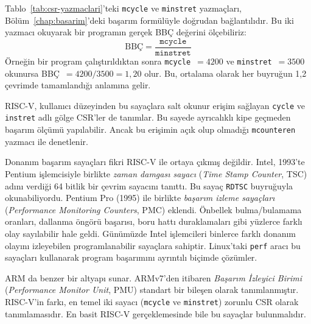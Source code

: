 \begin{bilginot}
Tablo~\ref{tab:csr-yazmaclari}'teki \texttt{mcycle} ve \texttt{minstret} yazmaçları, Bölüm~\ref{chap:basarim}'deki başarım formülüyle doğrudan bağlantılıdır. Bu iki yazmacı okuyarak bir programın gerçek BBÇ değerini ölçebiliriz:
\[
\text{BBÇ} = \frac{\texttt{mcycle}}{\texttt{minstret}}
\]
Örneğin bir program çalıştırıldıktan sonra \texttt{mcycle}~$= 4200$ ve \texttt{minstret}~$= 3500$ okunursa BBÇ~$= 4200 / 3500 = 1{,}20$ olur. Bu, ortalama olarak her buyruğun 1,2 çevrimde tamamlandığı anlamına gelir.

RISC-V, kullanıcı düzeyinden bu sayaçlara salt okunur erişim sağlayan \texttt{cycle} ve \texttt{instret} adlı gölge CSR'ler de tanımlar. Bu sayede ayrıcalıklı kipe geçmeden başarım ölçümü yapılabilir. Ancak bu erişimin açık olup olmadığı \texttt{mcounteren} yazmacı ile denetlenir.

Donanım başarım sayaçları fikri RISC-V ile ortaya çıkmış değildir. Intel, 1993'te Pentium işlemcisiyle birlikte \emph{zaman damgası sayacı} (\emph{Time Stamp Counter}, TSC) adını verdiği 64 bitlik bir çevrim sayacını tanıttı. Bu sayaç \texttt{RDTSC} buyruğuyla okunabiliyordu. Pentium Pro (1995) ile birlikte \emph{başarım izleme sayaçları} (\emph{Performance Monitoring Counters}, PMC) eklendi. Önbellek bulma/bulamama oranları, dallanma öngörü başarısı, boru hattı duraklamaları gibi yüzlerce farklı olay sayılabilir hale geldi. Günümüzde Intel işlemcileri binlerce farklı donanım olayını izleyebilen programlanabilir sayaçlara sahiptir. Linux'taki \texttt{perf} aracı bu sayaçları kullanarak program başarımını ayrıntılı biçimde çözümler.

ARM da benzer bir altyapı sunar. ARMv7'den itibaren \emph{Başarım İzleyici Birimi} (\emph{Performance Monitor Unit}, PMU) standart bir bileşen olarak tanımlanmıştır. RISC-V'in farkı, en temel iki sayacı (\texttt{mcycle} ve \texttt{minstret}) zorunlu CSR olarak tanımlamasıdır. En basit RISC-V gerçeklemesinde bile bu sayaçlar bulunmalıdır.
\end{bilginot}

